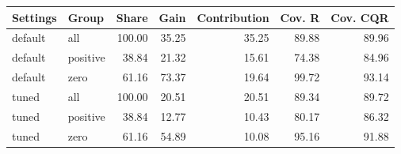\begin{tabular}{llrrrrr}
\toprule
Settings & Group & Share & Gain & Contribution & Cov. R & Cov. CQR \\
\midrule
default & all & 100.00 & 35.25 & 35.25 & 89.88 & 89.96 \\
default & positive & 38.84 & 21.32 & 15.61 & 74.38 & 84.96 \\
default & zero & 61.16 & 73.37 & 19.64 & 99.72 & 93.14 \\
tuned & all & 100.00 & 20.51 & 20.51 & 89.34 & 89.72 \\
tuned & positive & 38.84 & 12.77 & 10.43 & 80.17 & 86.32 \\
tuned & zero & 61.16 & 54.89 & 10.08 & 95.16 & 91.88 \\
\bottomrule
\end{tabular}
